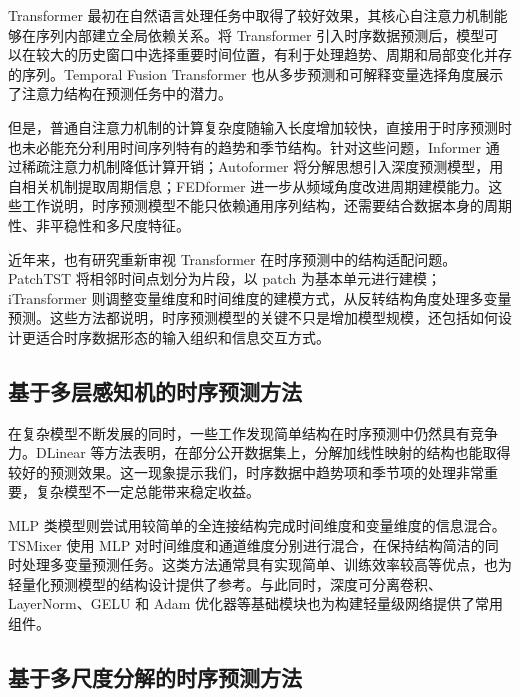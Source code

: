 Transformer\cite{vaswani2017attention} 最初在自然语言处理任务中取得了较好效果，其核心自注意力机制能够在序列内部建立全局依赖关系。将 Transformer 引入时序数据预测后，模型可以在较大的历史窗口中选择重要时间位置，有利于处理趋势、周期和局部变化并存的序列。Temporal Fusion Transformer\cite{lim2021tft} 也从多步预测和可解释变量选择角度展示了注意力结构在预测任务中的潜力。

但是，普通自注意力机制的计算复杂度随输入长度增加较快，直接用于时序预测时也未必能充分利用时间序列特有的趋势和季节结构。针对这些问题，Informer\cite{zhou2021informer} 通过稀疏注意力机制降低计算开销；Autoformer\cite{wu2021autoformer} 将分解思想引入深度预测模型，用自相关机制提取周期信息；FEDformer\cite{zhou2022fedformer} 进一步从频域角度改进周期建模能力。这些工作说明，时序预测模型不能只依赖通用序列结构，还需要结合数据本身的周期性、非平稳性和多尺度特征。

近年来，也有研究重新审视 Transformer 在时序预测中的结构适配问题。PatchTST\cite{nie2023time} 将相邻时间点划分为片段，以 patch 为基本单元进行建模；iTransformer\cite{liu2023itransformer} 则调整变量维度和时间维度的建模方式，从反转结构角度处理多变量预测。这些方法都说明，时序预测模型的关键不只是增加模型规模，还包括如何设计更适合时序数据形态的输入组织和信息交互方式。

\subsection{基于多层感知机的时序预测方法}

在复杂模型不断发展的同时，一些工作发现简单结构在时序预测中仍然具有竞争力。DLinear\cite{zeng2023transformers} 等方法表明，在部分公开数据集上，分解加线性映射的结构也能取得较好的预测效果。这一现象提示我们，时序数据中趋势项和季节项的处理非常重要，复杂模型不一定总能带来稳定收益。

MLP 类模型则尝试用较简单的全连接结构完成时间维度和变量维度的信息混合。TSMixer\cite{chen2023tsmixer} 使用 MLP 对时间维度和通道维度分别进行混合，在保持结构简洁的同时处理多变量预测任务。这类方法通常具有实现简单、训练效率较高等优点，也为轻量化预测模型的结构设计提供了参考。与此同时，深度可分离卷积\cite{howard2017mobilenets}、LayerNorm\cite{ba2016layer}、GELU\cite{hendrycks2016gelu} 和 Adam\cite{kingma2014adam} 优化器等基础模块也为构建轻量级网络提供了常用组件。

\subsection{基于多尺度分解的时序预测方法}

